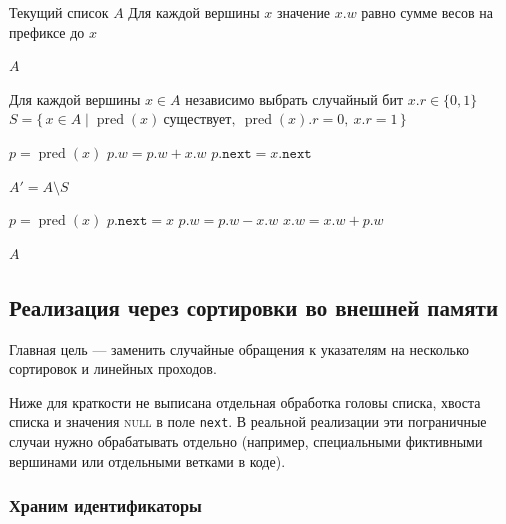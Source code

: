 	\begin{algorithm}[H]
		\caption{\textsc{PrefixSums-Conceptual}$(A)$}
		\begin{algorithmic}[1]
			\Require Текущий список $A$
			\Ensure Для каждой вершины $x$ значение $x.w$ равно сумме весов на префиксе до $x$
			
			\State \Return $A$
			\EndIf
			
			\State Для каждой вершины $x \in A$ независимо выбрать случайный бит $x.r \in \{0,1\}$
			\State $S = \{\, x \in A \mid \operatorname{pred}(x)\ \text{существует},\ \operatorname{pred}(x).r = 0,\ x.r = 1 \,\}$
			
			\State $p = \operatorname{pred}(x)$
			\State $p.w = p.w + x.w$
			\State $p.\texttt{next} = x.\texttt{next}$
			\EndFor
			
			\State $A' = A \setminus S$
			\State {}
			
			\State $p = \operatorname{pred}(x)$
			\State $p.\texttt{next} = x$
			\State $p.w = p.w - x.w$ 
			\State $x.w = x.w + p.w$ 
			\EndFor
			
			\State \Return $A$
		\end{algorithmic}
	\end{algorithm}
	
	\subsection{Реализация через сортировки во внешней памяти}
	
	Главная цель --- заменить случайные обращения к указателям на несколько сортировок и линейных проходов.
	
	\begin{Remark}{}{}
		Ниже для краткости не выписана отдельная обработка головы списка, хвоста списка и значения \textsc{null} в поле \texttt{next}.
		В реальной реализации эти пограничные случаи нужно обрабатывать отдельно
		(например, специальными фиктивными вершинами или отдельными ветками в коде).
	\end{Remark}
	\subsubsection*{Храним идентификаторы}
	
